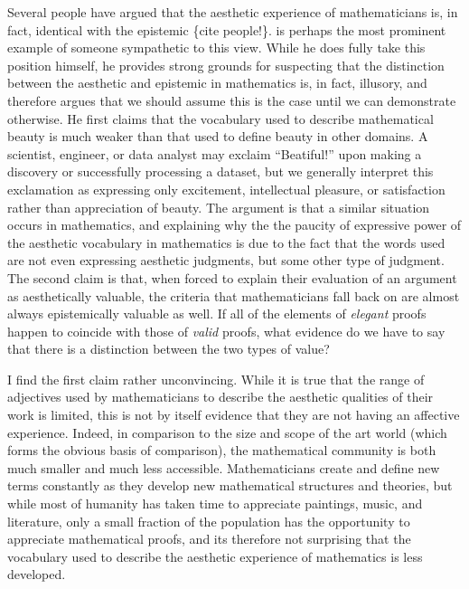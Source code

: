 \documentclass[a4paper,man,natbib]{apa6}
\begin{document}
Several people have argued that the aesthetic experience of mathematicians is, in fact, identical with the epistemic
 \{cite people!\}.
\cite{todd_unmasking_2008} is perhaps the most prominent example of someone sympathetic to this view. While he
does fully take this position himself, he provides strong grounds for suspecting that the distinction between
the aesthetic and epistemic in mathematics is, in fact, illusory, and therefore argues that we should assume 
this is the case until we can demonstrate otherwise. He first claims that the vocabulary used to
describe mathematical beauty is much weaker than that used to define beauty in other domains. A scientist, engineer,
or data analyst may exclaim ``Beatiful!'' upon making a discovery or successfully processing a dataset, but we generally
interpret this exclamation as expressing only excitement, intellectual pleasure, or satisfaction rather than appreciation
of beauty. The argument is that a similar situation occurs in mathematics, and explaining why the the paucity of expressive
power of the aesthetic vocabulary in mathematics
is due to the fact that the words used are not even expressing aesthetic judgments, but some other type of judgment. The
second claim is that, when forced to explain their evaluation of an argument
as aesthetically valuable, the criteria that mathematicians fall back on are almost always epistemically valuable as well.
If all of the elements of \textit{elegant} proofs happen to coincide with those of \textit{valid} proofs, what evidence do we have to say
that there is a distinction between the two types of value?

I find the first claim rather unconvincing. While it is true that the range of adjectives used by mathematicians to describe
the aesthetic qualities of their work is limited, this is not by itself evidence that they are not having an affective
experience. Indeed, in comparison to the size and scope of the art world (which forms the obvious basis of comparison),
the mathematical community is both much smaller and much less accessible. Mathematicians create and define new terms
constantly as they develop new mathematical structures and theories, but while most of humanity has taken time to 
appreciate paintings, music, and literature, only a small fraction of the population has the opportunity to appreciate
mathematical proofs, and its therefore not surprising that the vocabulary used to describe the aesthetic experience
of mathematics is less developed.
\end{document}
